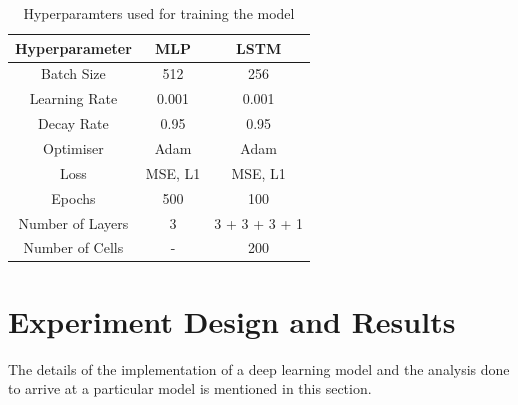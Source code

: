 \documentclass{article}
\begin{document}
\begin{itemize}
  \begin{table}
    \centering
    \begin{tabular}{|c|c|c|}
      \hline
      Hyperparameter & MLP & LSTM \\
      \hline
      Batch Size & 512 & 256 \\
      \hline
      Learning Rate & 0.001 & 0.001 \\
      \hline
      Decay Rate & 0.95 & 0.95 \\
      \hline
      Optimiser & Adam & Adam \\
      \hline
      Loss & MSE, L1 & MSE, L1 \\
      \hline
      Epochs & 500 & 100 \\
      \hline
      Number of Layers & 3 & 3 + 3 + 3 + 1  \\
      \hline
      Number of Cells & - & 200 \\
      \hline
    \end{tabular}
    \caption{Hyperparamters used for training the model}
    \label{tab:hyperparamters}
  \end{table}
\end{itemize}

\section{Experiment Design and Results}
The details of the implementation of a deep learning model and the analysis done to arrive at a particular model is mentioned in this section.
\end{document}
